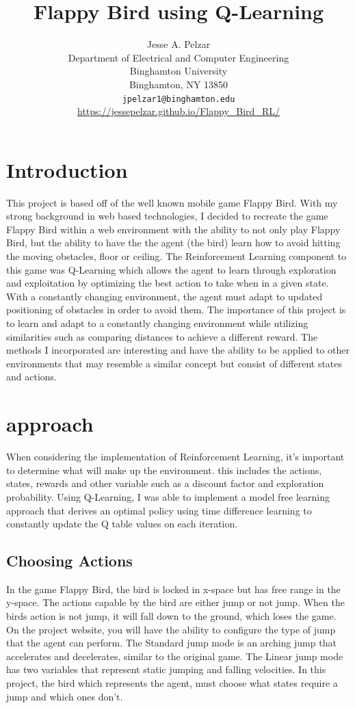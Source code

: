 \documentclass{article}
\title{Flappy Bird using Q-Learning}
\author{%
  Jesse A. Pelzar\\
  Department of Electrical and Computer Engineering\\
  Binghamton University\\
  Binghamton, NY 13850\\
  \texttt{jpelzar1@binghamton.edu} \\
  \url{https://jessepelzar.github.io/Flappy_Bird_RL/}
}
\begin{document}
\maketitle


\section{Introduction}


This project is based off of the well known mobile game Flappy Bird. With my strong background in web based technologies, I decided to recreate the game Flappy Bird within a web environment with the ability to not only play Flappy Bird, but the ability to have the the agent (the bird) learn how to avoid hitting the moving obstacles, floor or ceiling. The Reinforcement Learning component to this game was Q-Learning which allows the agent to learn through exploration and exploitation by optimizing the best action to take when in a given state. With a constantly changing environment, the agent must adapt to updated positioning of obstacles in order to avoid them. The importance of this project is to learn and adapt to a constantly changing environment while utilizing similarities such as comparing distances to achieve a different reward. The methods I incorporated are interesting and have the ability to be applied to other environments that may resemble a similar concept but consist of different states and actions.  

\section{approach}

When considering the implementation of Reinforcement Learning, it's important to  determine what will make up the environment. this includes the actions, states, rewards and other variable such as a discount factor and exploration probability. Using Q-Learning, I was able to implement a model free learning approach that derives an optimal policy using time difference learning to constantly update the Q table values on each iteration. 

\subsection{Choosing Actions}

In the game Flappy Bird, the bird is locked in x-space but has free range in the y-space. The actions capable by the bird are either jump or not jump. When the birds action is not jump, it will fall down to the ground, which loses the game. On the project website, you will have the ability to configure the type of jump that the agent can perform. The Standard jump mode is an arching jump that accelerates and decelerates, similar to the original game. The Linear jump mode has two variables that represent static jumping and falling velocities. In this project, the bird which represents the agent, must choose what states require a jump and which ones don't. 
\end{document}
